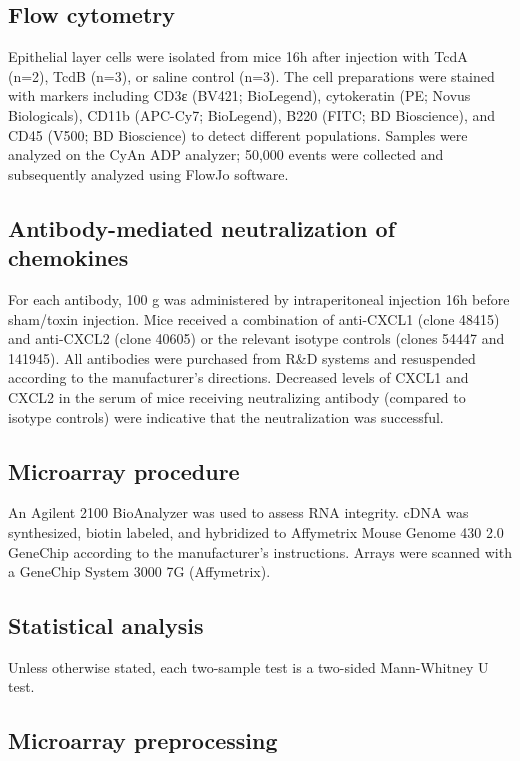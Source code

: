 \subsection{ Flow cytometry }
Epithelial layer cells were isolated from mice 16h after injection 
with TcdA (n=2), TcdB (n=3), or saline control (n=3). The cell preparations 
were stained with markers including CD3ε (BV421; BioLegend), cytokeratin 
(PE; Novus Biologicals), CD11b (APC-Cy7; BioLegend), B220 (FITC; BD Bioscience), 
and CD45 (V500; BD Bioscience) to detect different populations.  Samples 
were analyzed on the CyAn ADP analyzer; 50,000 events were collected and 
subsequently analyzed using FlowJo software.  

\subsection{Antibody-mediated neutralization of chemokines}
For each antibody, 100 \textmugreek{}g was administered by intraperitoneal 
injection 16h before sham/toxin injection. Mice received a combination 
of anti-CXCL1 (clone 48415) and anti-CXCL2 (clone 40605) or the relevant 
isotype controls (clones 54447 and 141945). All antibodies were 
purchased from R\&{}D systems and resuspended according to the manufacturer's 
directions. Decreased levels of CXCL1 and CXCL2 in the serum of mice 
receiving neutralizing antibody (compared to isotype controls) were 
indicative that the neutralization was successful.

\subsection{ Microarray procedure }
An Agilent 2100 BioAnalyzer was used to assess RNA integrity. cDNA 
was synthesized, biotin labeled, and hybridized to Affymetrix Mouse 
Genome 430 2.0 GeneChip according to the manufacturer's instructions. 
Arrays were scanned with a GeneChip System 3000 7G (Affymetrix).

\subsection{ Statistical analysis }
Unless otherwise stated, each two-sample test is a two-sided Mann-Whitney U test.

\subsection{ Microarray preprocessing }
\label{ini:methods:bioinformatics}

